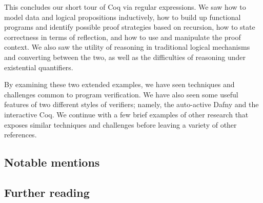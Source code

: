 This concludes our short tour of Coq via regular expressions. We saw how to
model data and logical propositions inductively, how to build up functional
programs and identify possible proof strategies based on recursion, how to state
correctness in terms of reflection, and how to use and manipulate the proof
context. We also saw the utility of reasoning in traditional logical mechanisms
and converting between the two, as well as the difficulties of reasoning under
existential quantifiers.

By examining these two extended examples, we have seen techniques and challenges
common to program verification. We have also seen some useful features of two
different styles of verifiers; namely, the auto-active Dafny and the interactive
Coq. We continue with a few brief examples of other research that exposes
similar techniques and challenges before leaving a variety of other references.

\subsection{Notable mentions}\label{S:ex_notable}

\subsection{Further reading}\label{S:ex_reading}
